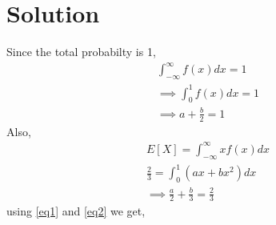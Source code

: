 \documentclass[journal,12pt,twocolumn]{IEEEtran}
\begin{document}
\section{Solution}
Since the total probabilty is 1,\\
\begin{align}
\int_{-\infty}^{\infty}f(x)dx=1 \\
\implies \int_{0}^{1}f(x)dx=1 \\
\implies a+\frac{b}{2}=1 \label{eq1}
 \end{align}
 Also,
 \begin{align}
     E[X]=\int_{-\infty}^{\infty}xf(x)dx\\
     \frac{2}{3}=\int_{0}^{1}(ax+bx^{2})dx\\
     \implies \frac{a}{2}+\frac{b}{3}=\frac{2}{3}\label{eq2}
\end{align}
using \eqref{eq1} and \eqref{eq2} we get,\\
\end{document}
